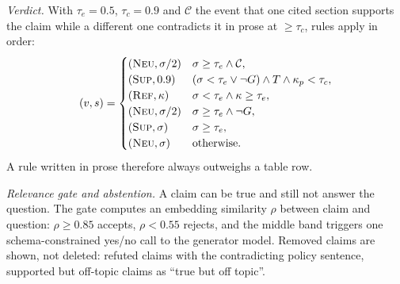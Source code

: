 \documentclass[conference]{IEEEtran}
\newcommand{\SUP}{\textsc{Sup}}
\newcommand{\REF}{\textsc{Ref}}
\newcommand{\NEU}{\textsc{Neu}}
\begin{document}
\textit{Verdict.} With $\tau_e=0.5$, $\tau_c=0.9$ and $\mathcal{C}$ the event that one cited section
supports the claim while a different one contradicts it in prose at $\ge\tau_c$, rules apply in order:
\begin{equation}
(v,s)=\begin{cases}
(\NEU,\sigma/2) & \sigma\ge\tau_e\wedge\mathcal{C},\\
(\SUP,0.9) & (\sigma<\tau_e\vee\neg G)\wedge T\wedge\kappa_p<\tau_c,\\
(\REF,\kappa) & \sigma<\tau_e\wedge\kappa\ge\tau_e,\\
(\NEU,\sigma/2) & \sigma\ge\tau_e\wedge\neg G,\\
(\SUP,\sigma) & \sigma\ge\tau_e,\\
(\NEU,\sigma) & \text{otherwise.}
\end{cases}\label{eq:verdict}
\end{equation}
A rule written in prose therefore always outweighs a table row.

\textit{Relevance gate and abstention.} A claim can be true and still not answer the question. The gate
computes an embedding similarity $\rho$ between claim and question: $\rho\ge0.85$ accepts, $\rho<0.55$
rejects, and the middle band triggers one schema-constrained yes/no call to the generator model. Removed
claims are shown, not deleted: refuted claims with the contradicting policy sentence, supported but
off-topic claims as ``true but off topic''.
\end{document}
